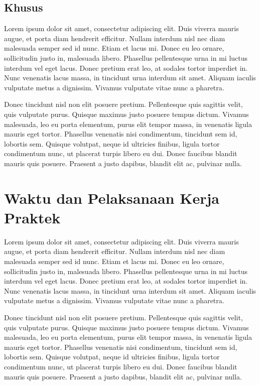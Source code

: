 \subsection{Khusus}
Lorem ipsum dolor sit amet, consectetur adipiscing elit. Duis viverra mauris augue, et porta diam hendrerit efficitur. Nullam interdum nisl nec diam malesuada semper sed id nunc. Etiam et lacus mi. Donec eu leo ornare, sollicitudin justo in, malesuada libero. Phasellus pellentesque urna in mi luctus interdum vel eget lacus. Donec pretium erat leo, at sodales tortor imperdiet in. Nunc venenatis lacus massa, in tincidunt urna interdum sit amet. Aliquam iaculis vulputate metus a dignissim. Vivamus vulputate vitae nunc a pharetra.

Donec tincidunt nisl non elit posuere pretium. Pellentesque quis sagittis velit, quis vulputate purus. Quisque maximus justo posuere tempus dictum. Vivamus malesuada, leo eu porta elementum, purus elit tempor massa, in venenatis ligula mauris eget tortor. Phasellus venenatis nisi condimentum, tincidunt sem id, lobortis sem. Quisque volutpat, neque id ultricies finibus, ligula tortor condimentum nunc, ut placerat turpis libero eu dui. Donec faucibus blandit mauris quis posuere. Praesent a justo dapibus, blandit elit ac, pulvinar nulla. 


\section{Waktu dan Pelaksanaan Kerja Praktek}
Lorem ipsum dolor sit amet, consectetur adipiscing elit. Duis viverra mauris augue, et porta diam hendrerit efficitur. Nullam interdum nisl nec diam malesuada semper sed id nunc. Etiam et lacus mi. Donec eu leo ornare, sollicitudin justo in, malesuada libero. Phasellus pellentesque urna in mi luctus interdum vel eget lacus. Donec pretium erat leo, at sodales tortor imperdiet in. Nunc venenatis lacus massa, in tincidunt urna interdum sit amet. Aliquam iaculis vulputate metus a dignissim. Vivamus vulputate vitae nunc a pharetra.

Donec tincidunt nisl non elit posuere pretium. Pellentesque quis sagittis velit, quis vulputate purus. Quisque maximus justo posuere tempus dictum. Vivamus malesuada, leo eu porta elementum, purus elit tempor massa, in venenatis ligula mauris eget tortor. Phasellus venenatis nisi condimentum, tincidunt sem id, lobortis sem. Quisque volutpat, neque id ultricies finibus, ligula tortor condimentum nunc, ut placerat turpis libero eu dui. Donec faucibus blandit mauris quis posuere. Praesent a justo dapibus, blandit elit ac, pulvinar nulla. 



